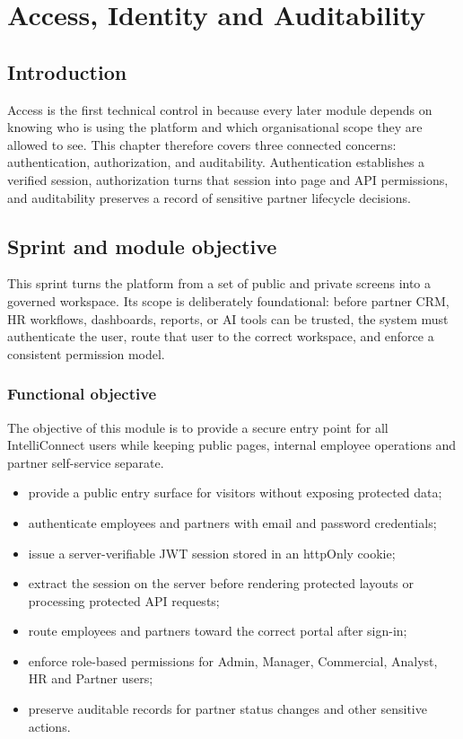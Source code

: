 \chapter{Access, Identity and Auditability}
\section*{Introduction}
Access is the first technical control in \projectname{} because every later module depends on knowing who is using the platform and which organisational scope they are allowed to see. This chapter therefore covers three connected concerns: authentication, authorization, and auditability. Authentication establishes a verified session, authorization turns that session into page and API permissions, and auditability preserves a record of sensitive partner lifecycle decisions.
\section{Sprint and module objective}
This sprint turns the platform from a set of public and private screens into a governed workspace. Its scope is deliberately foundational: before partner CRM, HR workflows, dashboards, reports, or AI tools can be trusted, the system must authenticate the user, route that user to the correct workspace, and enforce a consistent permission model.
\subsection{Functional objective}
The objective of this module is to provide a secure entry point for all IntelliConnect users while keeping public pages, internal employee operations and partner self-service separate.
\begin{itemize}
  \item provide a public entry surface for visitors without exposing protected data;
  \item authenticate employees and partners with email and password credentials;
  \item issue a server-verifiable JWT session stored in an httpOnly cookie;
  \item extract the session on the server before rendering protected layouts or processing protected API requests;
  \item route employees and partners toward the correct portal after sign-in;
  \item enforce role-based permissions for Admin, Manager, Commercial, Analyst, HR and Partner users;
  \item preserve auditable records for partner status changes and other sensitive actions.
\end{itemize}
